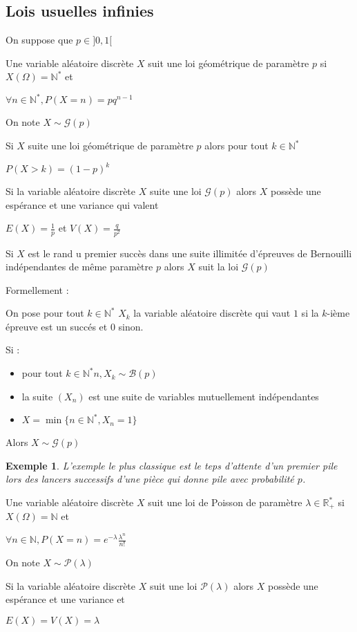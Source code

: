 \documentclass[a4paper,12pt]{book}
\newcommand{\Def}[2]{\begin{tcolorbox}[sharp corners, colback=white,colframe=blue!90!black!75, title=Définition : #1]#2\end{tcolorbox}}
\newcommand{\Prop}[2]{\begin{tcolorbox}[sharp corners, colback=white,colframe=red!90!black!75, title=Proposition : #1]#2\end{tcolorbox}}
\newtheorem{Exe}{Exemple}[section]
\def\R{\mathbb{R}}
\def\N{\mathbb{N}}
\begin{document}
\subsection{Lois usuelles infinies}
\Def{}{On suppose que $p\in]0,1[$
\par Une variable aléatoire discrète $X$ suit une loi géométrique de paramètre $p$ si $X(\Omega)=\N^*$ et
\par\begin{center}$\forall n\in\N^*, P(X=n)=pq^{n-1}$\end{center}
\par On note $X\sim\mathcal{G}(p)$}
\Prop{}{Si $X$ suite une loi géométrique de paramètre $p$ alors pour tout $k\in\N^*$
\par\begin{center}$P(X>k)=(1-p)^k$\end{center}}
\Prop{Espérance et variance d'une loi géométrique}{Si la variable aléatoire discrète $X$ suite une loi $\mathcal{G}(p)$ alors $X$ possède une espérance et une variance qui valent
\par\begin{center}$E(X)=\frac{1}{p}$ et $V(X)=\frac{q}{p^2}$\end{center}}
\Prop{Modèle loi géométrique}{Si $X$ est le rand u premier succès dans une suite illimitée d'épreuves de Bernouilli indépendantes de même paramètre $p$ alors $X$ suit la loi $\mathcal{G}(p)$
\par Formellement :
\par On pose pour tout $k\in\N^*$ $X_k$ la variable aléatoire discrète qui vaut $1$ si la $k$-ième épreuve est un succés et $0$ sinon.
\par Si :\begin{itemize}
\item pour tout $k\in\N^*n, X_k\sim\mathcal{B}(p)$
\item la suite $(X_n)$ est une suite de variables mutuellement indépendantes
\item $X = \min\{n\in\N^*, X_n=1\}$
\end{itemize}
Alors $X\sim\mathcal{G}(p)$}
\begin{Exe}
L'exemple le plus classique est le teps d'attente d'un premier pile lors des lancers successifs d'une pièce qui donne pile avec probabilité $p$.
\end{Exe}

\Def{Loi de Poisson}{Une variable aléatoire discrète $X$ suit une loi de Poisson de paramètre $\lambda\in\R_+^*$ si $X(\Omega)=\N$ et
\par\begin{center}$\forall n\in\N, P(X=n)=e^{-\lambda}\frac{\lambda^n}{n!}$\end{center}
\par On note $X\sim \mathcal{P}(\lambda)$}
\Prop{Espérance et variance d'une loi de Poisson}{Si la variable aléatoire discrète $X$ suit une loi $\mathcal{P}(\lambda)$ alors $X$ possède une espérance et une variance et
\par\begin{center}$E(X)=V(X)=\lambda$\end{center}}
\end{document}
